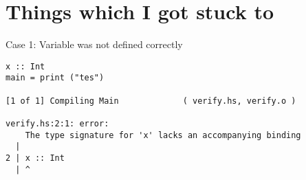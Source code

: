 \section{Things which I got stuck to}
Case 1: Variable was not defined correctly
\begin{lstlisting}
x :: Int
main = print ("tes")

[1 of 1] Compiling Main             ( verify.hs, verify.o )

verify.hs:2:1: error:
    The type signature for 'x' lacks an accompanying binding
  |
2 | x :: Int
  | ^
\end{lstlisting}
